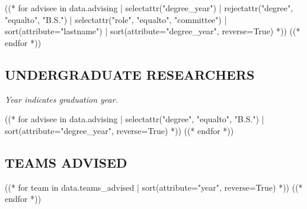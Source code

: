 
\begin{alignedentrieshang}
((* for advisee in data.advising | selectattr("degree_year") | rejectattr("degree", "equalto", "B.S.") | selectattr("role", "equalto", "committee") | sort(attribute="lastname") | sort(attribute="degree_year", reverse=True) *))
((* endfor *))
\end{alignedentrieshang}

\subsection{UNDERGRADUATE RESEARCHERS}

\textit{Year indicates graduation year.}

\medskip

\begin{alignedentrieshang}
((* for advisee in data.advising | selectattr("degree", "equalto", "B.S.") | sort(attribute="degree_year", reverse=True) *))
((* endfor *))
\end{alignedentrieshang}

\subsection{TEAMS ADVISED}

\begin{alignedentrieshang}
((* for team in data.teams_advised | sort(attribute="year", reverse=True) *))
((* endfor *))
\end{alignedentrieshang}

